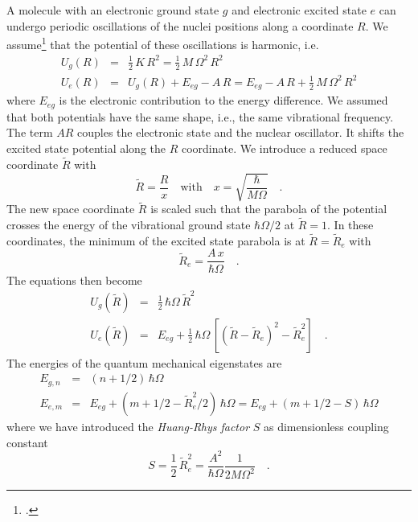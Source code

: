A molecule with an electronic ground state $g$ and electronic excited state $e$ can undergo periodic oscillations of the nuclei positions along a coordinate $R$. We assume\footcite{Kuzmany} that the potential of these oscillations is harmonic, i.e.
\begin{eqnarray}
 U_g(R) &=& \frac{1}{2} \,  K \, R^2 = \frac{1}{2} \, M \, \Omega^2 \, R^2 \\
  U_e(R) &=&  U_g(R) + E_{eg} - A \, R = E_{eg}  - A \, R + \frac{1}{2} \, M \, \Omega^2 \, R^2 
 \end{eqnarray}
where $E_{eg}$ is the electronic contribution to the energy difference. We assumed that both potentials have the same shape, i.e., the same vibrational frequency. 
The term $A R$ couples the electronic state and the nuclear oscillator. It shifts the excited state potential along the $R$ coordinate. 
%
We introduce a reduced space coordinate $\tilde{R}$ with
\begin{equation}
\tilde{R} = \frac{R}{x} \quad \text{with} \quad x = \sqrt{\frac{\hbar}{M \Omega}}  \quad .
\end{equation}
The new  space coordinate $\tilde{R}$ is scaled such that the parabola of the potential crosses the energy of the  vibrational ground state $\hbar \Omega/2$ at $\tilde{R} = 1$.
In these coordinates, the minimum of the excited state parabola is at $\tilde{R} = \tilde{R}_e$ with
\begin{equation}
\tilde{R}_e = \frac{A \, x}{ \hbar \Omega} \quad .
\end{equation}
The equations then become
\begin{eqnarray}
 U_g(\tilde{R}) &=& \frac{1}{2}  \, \hbar \Omega \, \tilde{R}^2 \\
  U_e(\tilde{R}) &=&   E_{eg} + \frac{1}{2}  \, \hbar \Omega  \, \left[  (\tilde{R} - \tilde{R}_e)^2 - \tilde{R}_e^2  \right] \quad .
 \end{eqnarray}
The energies of the quantum mechanical eigenstates are 
\begin{eqnarray}
  E_{g, n} &=&  (n + 1/2) \, \hbar \Omega  \\
  E_{e, m} &=&   E_{eg} +   (m + 1/2 - \tilde{R}_e^2  /2 ) \, \hbar \Omega  =  E_{eg} +   (m + 1/2 - S ) \, \hbar \Omega   \nonumber
\end{eqnarray}
where we have  introduced the \emph{Huang-Rhys factor} $S$ as dimensionless coupling constant
\begin{equation}
 S = \frac{1}{2} \, \tilde{R}_e^2  =
 \frac{A^2}{\hbar \Omega} \frac{1}{2 M \Omega^2} \quad .
\end{equation}

